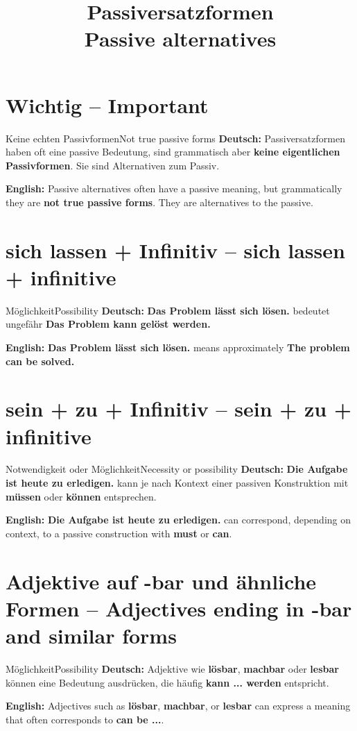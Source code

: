 \documentclass[a4paper,11pt]{article}
\title{Passiversatzformen\\[0.3em]\large\textnormal{Passive alternatives}}
\date{}
\newcommand{\GermanText}[1]{\textbf{Deutsch: }#1\par}
\newcommand{\EnglishText}[1]{{\small\color{SoftGray}\textbf{English: }#1\par}}
\begin{document}
\maketitle
\tableofcontents
\newpage

\section{Wichtig -- Important}
\begin{grammarentry}{Keine echten Passivformen}{Not true passive forms}
\GermanText{Passiversatzformen haben oft eine passive Bedeutung, sind grammatisch aber \textbf{keine eigentlichen Passivformen}. Sie sind Alternativen zum Passiv.}
\EnglishText{Passive alternatives often have a passive meaning, but grammatically they are \textbf{not true passive forms}. They are alternatives to the passive.}
\end{grammarentry}

\section{sich lassen + Infinitiv -- sich lassen + infinitive}
\begin{grammarentry}{Möglichkeit}{Possibility}
\GermanText{\textbf{Das Problem lässt sich lösen.} bedeutet ungefähr \textbf{Das Problem kann gelöst werden.}}
\EnglishText{\textbf{Das Problem lässt sich lösen.} means approximately \textbf{The problem can be solved.}}
\end{grammarentry}

\section{sein + zu + Infinitiv -- sein + zu + infinitive}
\begin{grammarentry}{Notwendigkeit oder Möglichkeit}{Necessity or possibility}
\GermanText{\textbf{Die Aufgabe ist heute zu erledigen.} kann je nach Kontext einer passiven Konstruktion mit \textbf{müssen} oder \textbf{können} entsprechen.}
\EnglishText{\textbf{Die Aufgabe ist heute zu erledigen.} can correspond, depending on context, to a passive construction with \textbf{must} or \textbf{can}.}
\end{grammarentry}

\section{Adjektive auf -bar und ähnliche Formen -- Adjectives ending in -bar and similar forms}
\begin{grammarentry}{Möglichkeit}{Possibility}
\GermanText{Adjektive wie \textbf{lösbar}, \textbf{machbar} oder \textbf{lesbar} können eine Bedeutung ausdrücken, die häufig \textbf{kann ... werden} entspricht.}
\EnglishText{Adjectives such as \textbf{lösbar}, \textbf{machbar}, or \textbf{lesbar} can express a meaning that often corresponds to \textbf{can be ...}.}
\end{grammarentry}
\end{document}

